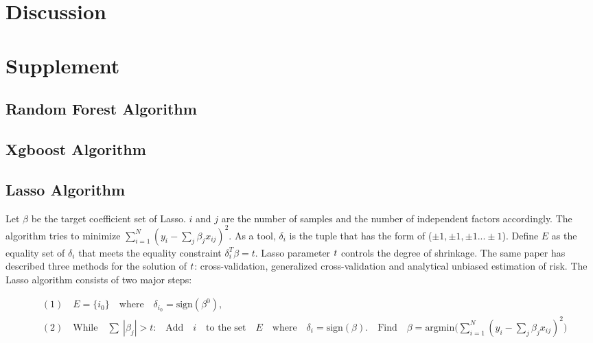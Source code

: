 \documentclass{article}
\begin{document}
\section{Discussion}
   

\section{Supplement}
\subsection{Random Forest Algorithm}

\subsection{Xgboost Algorithm}

\subsection{Lasso Algorithm}
Let \(\beta\) be the target coefficient set of Lasso. \(i\) and \(j\) are the number of samples and the number of independent factors accordingly. The algorithm tries to minimize \(\sum_{i = 1}^N{ (y_i - \sum_j\beta_j x_{ij})^2}\). As a tool, \(\delta_i\) is the tuple that has the form of (\(\pm1, \pm1,\pm1...\pm1\)). Define \( E\) as the equality set of \(\delta_i\) that meets the equality constraint \(\delta_i^T\beta = t\). Lasso parameter \( \mathnormal{t} \) controls the degree of shrinkage. The same paper has described three methods for the solution of  \( \mathnormal{t} \): cross-validation, generalized cross-validation and analytical unbiased estimation of risk. The Lasso algorithm consists of two major steps:
\par
\[
\begin{aligned}
&(1)\quad E =\{i_0\} \quad \textrm{where}\quad \delta_{i_0}= \textrm{sign} (\beta^0)\textrm{,}\\
&(2)\quad \textrm{While}\quad \sum\ |\beta_j| > t\textrm{:}\quad\textrm{Add}\quad i \quad \textrm{to the set} \quad E \quad \textrm{where} \quad \delta_i = \textrm{sign}(\beta).\quad \textrm{Find} \quad\beta = \textrm{argmin}(\sum_{i = 1}^N{ (y_i - \sum_j\beta_j x_{ij})^2)}
\end{aligned}
\]





\newpage


\end{document}
